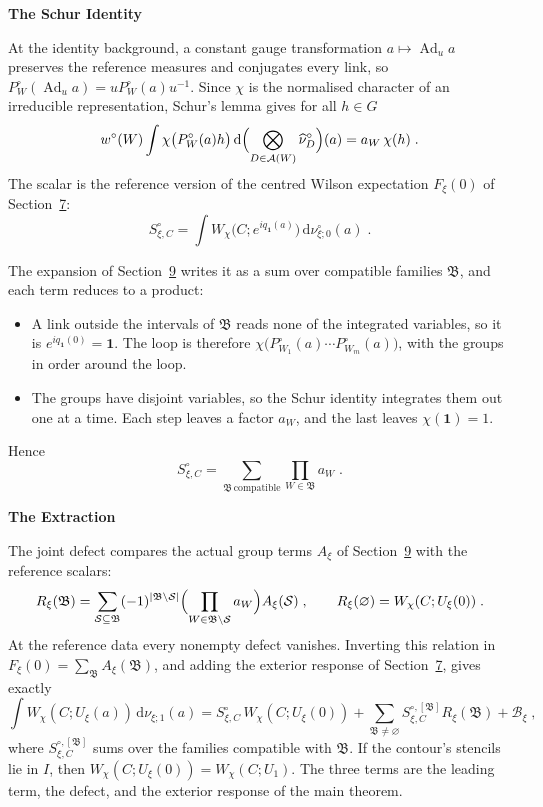 \documentclass[11pt,a4paper]{article}
\newcommand{\dd}{\mathrm{d}}
\newcommand{\id}{\mathbf 1}
\newcommand{\subhead}[1]{\par\vspace{4pt}\textbf{\color{ink}#1}\par}
\begin{document}
\subhead{The Schur Identity}
At the identity background, a constant gauge transformation $a\mapsto\operatorname{Ad}_ua$ preserves the reference measures and conjugates every link, so $P^\circ_W(\operatorname{Ad}_ua)=uP^\circ_W(a)u^{-1}$. Since $\chi$ is the normalised character of an irreducible representation, Schur's lemma gives for all $h \in G$
\begin{equation*}
    w^\circ(W)\int\chi\bigl(P^\circ_W(a)h\bigr)\,\dd\Bigl(\bigotimes_{D\in\mathcal A(W)}\widehat\nu^\circ_D\Bigr)(a)=a_W\,\chi(h)\;.
\end{equation*}
The scalar is the reference version of the centred Wilson expectation $F_\xi(0)$ of Section~\hyperref[summary:7]{7}:
\begin{equation*}
    S^\circ_{\xi,C}=\int W_\chi\bigl(C;e^{iq_{\id}(a)}\bigr)\,\dd\nu^\circ_{\xi;0}(a)\;.
\end{equation*}

The expansion of Section~\hyperref[summary:9]{9} writes it as a sum over compatible families $\mathfrak B$, and each term reduces to a product:
\begin{itemize}
    \item A link outside the intervals of $\mathfrak B$ reads none of the integrated variables, so it is $e^{iq_{\id}(0)}=\id$. The loop is therefore $\chi\bigl(P^\circ_{W_1}(a)\cdots P^\circ_{W_m}(a)\bigr)$, with the groups in order around the loop.
    \item The groups have disjoint variables, so the Schur identity integrates them out one at a time. Each step leaves a factor $a_W$, and the last leaves $\chi(\id)=1$.
\end{itemize}
Hence
\begin{equation*}
    S^\circ_{\xi,C}=\sum_{\mathfrak B\,\mathrm{compatible}}\prod_{W\in\mathfrak B}a_W\;.
\end{equation*}

\subhead{The Extraction}
The joint defect compares the actual group terms $A_\xi$ of Section~\hyperref[summary:9]{9} with the reference scalars:
\begin{equation*}
    R_\xi(\mathfrak B)=\sum_{\mathcal S\subseteq\mathfrak B}(-1)^{|\mathfrak B\setminus\mathcal S|}\Bigl(\prod_{W\in\mathfrak B\setminus\mathcal S}a_W\Bigr)A_\xi(\mathcal S)\;,\qquad R_\xi(\varnothing)=W_\chi(C;U_\xi(0))\;.
\end{equation*}
At the reference data every nonempty defect vanishes. Inverting this relation in $F_\xi(0)=\sum_{\mathfrak B}A_\xi(\mathfrak B)$, and adding the exterior response of Section~\hyperref[summary:7]{7}, gives exactly
\begin{equation*}
    \int W_\chi(C;U_\xi(a))\,\dd\nu_{\xi;1}(a)=S^\circ_{\xi,C}\,W_\chi(C;U_\xi(0))+\sum_{\mathfrak B\ne\varnothing}S^{\circ,[\mathfrak B]}_{\xi,C}R_\xi(\mathfrak B)+\mathcal B_\xi\;,
\end{equation*}
where $S^{\circ,[\mathfrak B]}_{\xi,C}$ sums over the families compatible with $\mathfrak B$. If the contour's stencils lie in $I$, then $W_\chi(C;U_\xi(0))=W_\chi(C;U_1)$. The three terms are the leading term, the defect, and the exterior response of the main theorem.
\end{document}

